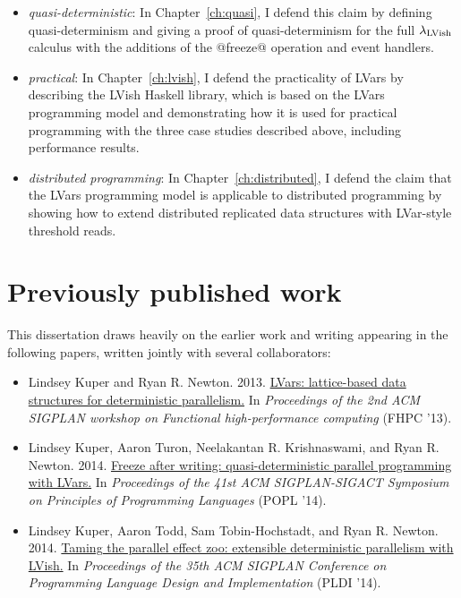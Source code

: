 \begin{itemize}
  \item \emph{quasi-deterministic}: In Chapter~\ref{ch:quasi}, I
    defend this claim by defining quasi-determinism and giving a proof
    of quasi-determinism for the full $\lambda_{\textrm{LVish}}$ calculus with the
    additions of the @freeze@ operation and event handlers.

  \item \emph{practical}: In Chapter~\ref{ch:lvish}, I defend the
    practicality of LVars by describing the LVish Haskell library,
    which is based on the LVars programming model and demonstrating
    how it is used for practical programming with the three case
    studies described above, including performance results.

  \item \emph{distributed programming}: In
    Chapter~\ref{ch:distributed}, I defend the claim that the LVars
    programming model is applicable to distributed programming by
    showing how to extend distributed replicated data structures with
    LVar-style threshold reads.
\end{itemize}

\section{Previously published work}

This dissertation draws heavily on the earlier work and writing
appearing in the following papers, written jointly with several
collaborators:

\begin{itemize}
\item Lindsey Kuper and Ryan
  R. Newton. 2013. \href{http://doi.acm.org/10.1145/2502323.2502326}{LVars:
    lattice-based data structures for deterministic parallelism.} In
  \emph{Proceedings of the 2nd ACM SIGPLAN workshop on Functional
    high-performance computing} (FHPC '13).

\item Lindsey Kuper, Aaron Turon, Neelakantan R. Krishnaswami, and
  Ryan
  R. Newton. 2014. \href{http://doi.acm.org/10.1145/2535838.2535842
  }{Freeze after writing: quasi-deterministic parallel programming
    with LVars.} In \emph{Proceedings of the 41st ACM SIGPLAN-SIGACT
    Symposium on Principles of Programming Languages} (POPL '14).

\item Lindsey Kuper, Aaron Todd, Sam Tobin-Hochstadt, and Ryan
  R. Newton. 2014. \href{http://doi.acm.org/10.1145/2594291.2594312
  }{Taming the parallel effect zoo: extensible deterministic
    parallelism with LVish.} In \emph{Proceedings of the 35th ACM
    SIGPLAN Conference on Programming Language Design and
    Implementation} (PLDI '14).

\end{itemize}

